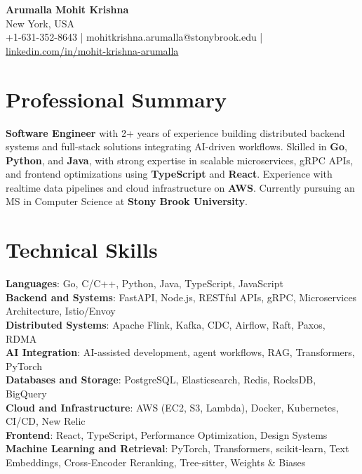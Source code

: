 \documentclass[letterpaper,11pt]{article}
\begin{document}
\begin{center}
  {\Large \textbf{Arumalla Mohit Krishna}} \\
  New York, USA \\
  +1-631-352-8643 \enspace | \enspace mohitkrishna.arumalla@stonybrook.edu \enspace | \enspace \href{https://www.linkedin.com/in/mohit-krishna-arumalla}{linkedin.com/in/mohit-krishna-arumalla}
\end{center}

\section{Professional Summary}
  \begin{itemize}[leftmargin=0.15in, label={}]
    \small{\item{
     \textbf{Software Engineer} with 2+ years of experience building distributed backend systems and full-stack solutions integrating AI-driven workflows. Skilled in \textbf{Go}, \textbf{Python}, and \textbf{Java}, with strong expertise in scalable microservices, gRPC APIs, and frontend optimizations using \textbf{TypeScript} and \textbf{React}. Experience with realtime data pipelines and cloud infrastructure on \textbf{AWS}. Currently pursuing an MS in Computer Science at \textbf{Stony Brook University}.
    }}
  \end{itemize}
\vspace{-16pt}

\section{Technical Skills}
 \begin{itemize}[leftmargin=0.15in, label={}]
    \small{\item{
     \textbf{Languages}: Go, C/C++, Python, Java, TypeScript, JavaScript \\
     \textbf{Backend and Systems}: FastAPI, Node.js, RESTful APIs, gRPC, Microservices Architecture, Istio/Envoy \\
     \textbf{Distributed Systems}: Apache Flink, Kafka, CDC, Airflow, Raft, Paxos, RDMA \\
	 \textbf{AI Integration}: AI-assisted development, agent workflows, RAG, Transformers, PyTorch \\
     \textbf{Databases and Storage}: PostgreSQL, Elasticsearch, Redis, RocksDB, BigQuery \\
     \textbf{Cloud and Infrastructure}: AWS (EC2, S3, Lambda), Docker, Kubernetes, CI/CD, New Relic \\
     \textbf{Frontend}: React, TypeScript, Performance Optimization, Design Systems \\
     \textbf{Machine Learning and Retrieval}: PyTorch, Transformers, scikit-learn, Text Embeddings, Cross-Encoder Reranking, Tree-sitter, Weights \& Biases
    }}
 \end{itemize}
\vspace{-16pt}
\end{document}

